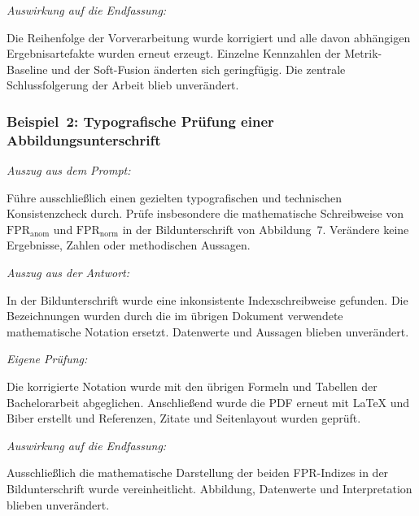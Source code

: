 \noindent\textit{Auswirkung auf die Endfassung:}\par
\begin{kiblock}
Die Reihenfolge der Vorverarbeitung wurde korrigiert und alle davon
abhängigen Ergebnisartefakte wurden erneut erzeugt. Einzelne Kennzahlen der
Metrik-Baseline und der Soft-Fusion änderten sich geringfügig. Die zentrale
Schlussfolgerung der Arbeit blieb unverändert.
\end{kiblock}

\subsubsection*{Beispiel~2: Typografische Prüfung einer Abbildungsunterschrift}

\noindent\textit{Auszug aus dem Prompt:}\par
\begin{kiblock}
Führe ausschließlich einen gezielten typografischen und
technischen Konsistenzcheck durch. Prüfe insbesondere die mathematische
Schreibweise von \(\text{FPR}_{\text{anom}}\) und \(\text{FPR}_{\text{norm}}\)
in der Bildunterschrift von Abbildung~7. Verändere keine Ergebnisse, Zahlen
oder methodischen Aussagen.
\end{kiblock}

\noindent\textit{Auszug aus der Antwort:}\par
\begin{kiblock}
In der Bildunterschrift wurde eine inkonsistente
Indexschreibweise gefunden. Die Bezeichnungen wurden durch die im übrigen
Dokument verwendete mathematische Notation ersetzt. Datenwerte und Aussagen
blieben unverändert.
\end{kiblock}

\noindent\textit{Eigene Prüfung:}\par
\begin{kiblock}
Die korrigierte Notation wurde mit den übrigen Formeln und
Tabellen der Bachelorarbeit abgeglichen. Anschließend wurde die PDF erneut mit
\LaTeX{} und Biber erstellt und Referenzen, Zitate und Seitenlayout wurden geprüft.
\end{kiblock}

\noindent\textit{Auswirkung auf die Endfassung:}\par
\begin{kiblock}
Ausschließlich die mathematische Darstellung der beiden FPR-Indizes in der
Bildunterschrift wurde vereinheitlicht. Abbildung, Datenwerte und Interpretation
blieben unverändert.
\end{kiblock}

